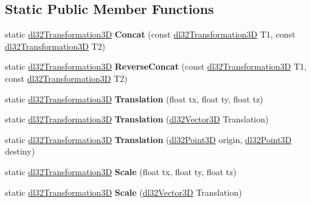 \subsection*{Static Public Member Functions}
\begin{DoxyCompactItemize}
\item 
\hypertarget{classdl32_transformation3_d_afac2a905e5484d69d19c0acba33fe8d5}{static \hyperlink{classdl32_transformation3_d}{dl32\-Transformation3\-D} {\bfseries Concat} (const \hyperlink{classdl32_transformation3_d}{dl32\-Transformation3\-D} T1, const \hyperlink{classdl32_transformation3_d}{dl32\-Transformation3\-D} T2)}\label{classdl32_transformation3_d_afac2a905e5484d69d19c0acba33fe8d5}

\item 
\hypertarget{classdl32_transformation3_d_aa529fc1265e42970b95d9538956a53de}{static \hyperlink{classdl32_transformation3_d}{dl32\-Transformation3\-D} {\bfseries Reverse\-Concat} (const \hyperlink{classdl32_transformation3_d}{dl32\-Transformation3\-D} T1, const \hyperlink{classdl32_transformation3_d}{dl32\-Transformation3\-D} T2)}\label{classdl32_transformation3_d_aa529fc1265e42970b95d9538956a53de}

\item 
\hypertarget{classdl32_transformation3_d_a3d05322e4aafcfeb237981526938db2f}{static \hyperlink{classdl32_transformation3_d}{dl32\-Transformation3\-D} {\bfseries Translation} (float tx, float ty, float tz)}\label{classdl32_transformation3_d_a3d05322e4aafcfeb237981526938db2f}

\item 
\hypertarget{classdl32_transformation3_d_a8e5c064b0eacfdf6f1e6bdfd9fc9e846}{static \hyperlink{classdl32_transformation3_d}{dl32\-Transformation3\-D} {\bfseries Translation} (\hyperlink{structdl32_vector3_d}{dl32\-Vector3\-D} Translation)}\label{classdl32_transformation3_d_a8e5c064b0eacfdf6f1e6bdfd9fc9e846}

\item 
\hypertarget{classdl32_transformation3_d_a1ff894fc7ba94583de5cb32c905f954e}{static \hyperlink{classdl32_transformation3_d}{dl32\-Transformation3\-D} {\bfseries Translation} (\hyperlink{structdl32_point3_d}{dl32\-Point3\-D} origin, \hyperlink{structdl32_point3_d}{dl32\-Point3\-D} destiny)}\label{classdl32_transformation3_d_a1ff894fc7ba94583de5cb32c905f954e}

\item 
\hypertarget{classdl32_transformation3_d_a5a74d8d4de6568b0f0331b03559fabe6}{static \hyperlink{classdl32_transformation3_d}{dl32\-Transformation3\-D} {\bfseries Scale} (float tx, float ty, float tz)}\label{classdl32_transformation3_d_a5a74d8d4de6568b0f0331b03559fabe6}

\item 
\hypertarget{classdl32_transformation3_d_ab6ce710103cc6ff20b1f6609918f9153}{static \hyperlink{classdl32_transformation3_d}{dl32\-Transformation3\-D} {\bfseries Scale} (\hyperlink{structdl32_vector3_d}{dl32\-Vector3\-D} Translation)}\label{classdl32_transformation3_d_ab6ce710103cc6ff20b1f6609918f9153}

\end{DoxyCompactItemize}

